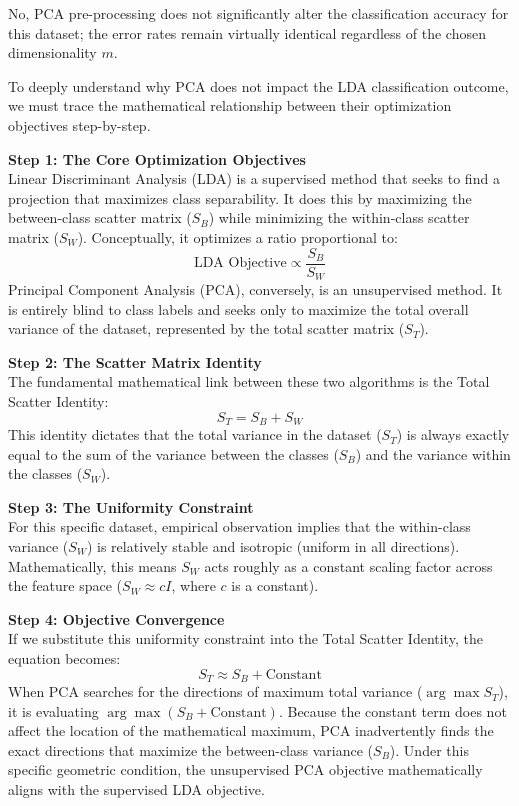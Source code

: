 No, PCA pre-processing does not significantly alter the classification accuracy for this dataset; the error rates remain virtually identical regardless of the chosen dimensionality $m$.

To deeply understand why PCA does not impact the LDA classification outcome, we must trace the mathematical relationship between their optimization objectives step-by-step.

\vspace{0.3cm}
\noindent\textbf{Step 1: The Core Optimization Objectives}\\
Linear Discriminant Analysis (LDA) is a supervised method that seeks to find a projection that maximizes class separability. It does this by maximizing the between-class scatter matrix ($S_B$) while minimizing the within-class scatter matrix ($S_W$). Conceptually, it optimizes a ratio proportional to:
\[
\text{LDA Objective} \propto \frac{S_B}{S_W}
\]
Principal Component Analysis (PCA), conversely, is an unsupervised method. It is entirely blind to class labels and seeks only to maximize the total overall variance of the dataset, represented by the total scatter matrix ($S_T$).

\vspace{0.3cm}
\noindent\textbf{Step 2: The Scatter Matrix Identity}\\
The fundamental mathematical link between these two algorithms is the Total Scatter Identity:
\[
S_T = S_B + S_W
\]
This identity dictates that the total variance in the dataset ($S_T$) is always exactly equal to the sum of the variance between the classes ($S_B$) and the variance within the classes ($S_W$).

\vspace{0.3cm}
\noindent\textbf{Step 3: The Uniformity Constraint}\\
For this specific dataset, empirical observation implies that the within-class variance ($S_W$) is relatively stable and isotropic (uniform in all directions). Mathematically, this means $S_W$ acts roughly as a constant scaling factor across the feature space ($S_W \approx cI$, where $c$ is a constant).

\vspace{0.3cm}
\noindent\textbf{Step 4: Objective Convergence}\\
If we substitute this uniformity constraint into the Total Scatter Identity, the equation becomes:
\[
S_T \approx S_B + \text{Constant}
\]
When PCA searches for the directions of maximum total variance ($\arg\max S_T$), it is evaluating $\arg\max(S_B + \text{Constant})$. Because the constant term does not affect the location of the mathematical maximum, PCA inadvertently finds the exact directions that maximize the between-class variance ($S_B$). Under this specific geometric condition, the unsupervised PCA objective mathematically aligns with the supervised LDA objective.

